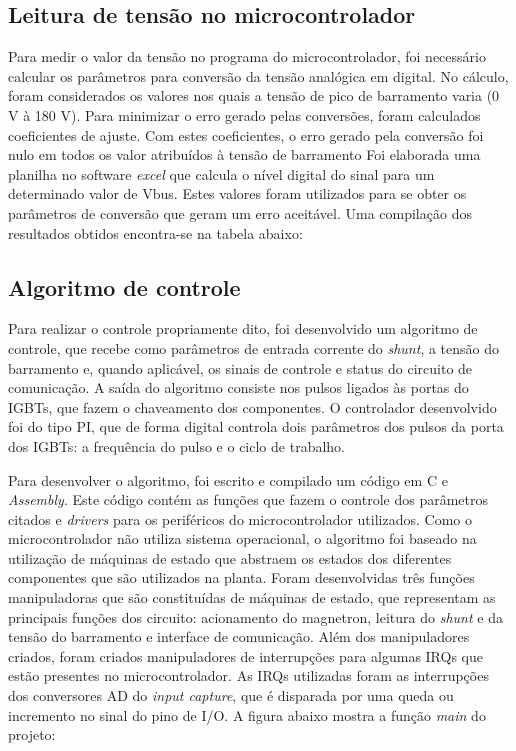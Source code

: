 \subsection{Leitura de tensão no microcontrolador}
Para medir o valor da tensão no programa do microcontrolador, foi necessário calcular os parâmetros para conversão da tensão analógica em digital. No cálculo, foram considerados os valores nos quais a tensão de pico de barramento varia (0 V à 180 V). Para minimizar o erro gerado pelas conversões, foram calculados coeficientes de ajuste. Com estes coeficientes, o erro gerado pela conversão foi nulo em todos os valor atribuídos à tensão de barramento Foi elaborada uma planilha no software \textit{excel} que calcula o nível digital do sinal para um determinado valor de Vbus. Estes valores foram utilizados para se obter os parâmetros de conversão que geram um erro aceitável. Uma compilação dos resultados obtidos encontra-se na tabela abaixo:


\subsection{Algoritmo de controle}
Para realizar o controle propriamente dito, foi desenvolvido um algoritmo de controle, que recebe como parâmetros de entrada corrente do \textit{shunt}, a tensão do barramento e, quando aplicável, os sinais de controle e status do circuito de comunicação. A saída do algoritmo consiste nos pulsos ligados às portas do IGBTs, que fazem o chaveamento dos componentes. O controlador desenvolvido foi do tipo PI, que de forma digital controla dois parâmetros dos pulsos da porta dos IGBTs: a frequência do pulso e o ciclo de trabalho.

Para desenvolver o algoritmo, foi escrito e compilado um código em C e \textit{Assembly}. Este código contém as funções que fazem o controle dos parâmetros citados e \textit{drivers} para os periféricos do microcontrolador utilizados. Como o microcontrolador não utiliza sistema operacional, o algoritmo foi baseado na utilização de máquinas de estado que abstraem os estados dos diferentes componentes que são utilizados na planta. Foram desenvolvidas três funções manipuladoras que são constituídas de máquinas de estado, que representam as principais funções dos circuito: acionamento do magnetron, leitura do \textit{shunt} e da tensão do barramento e interface de comunicação. Além dos manipuladores criados, foram criados manipuladores de interrupções para algumas IRQs que estão presentes no microcontrolador. As IRQs utilizadas foram as interrupções dos conversores AD do \textit{input capture}, que é disparada por uma queda ou incremento no sinal do pino de I/O. A figura abaixo mostra a função \textit{main} do projeto:

